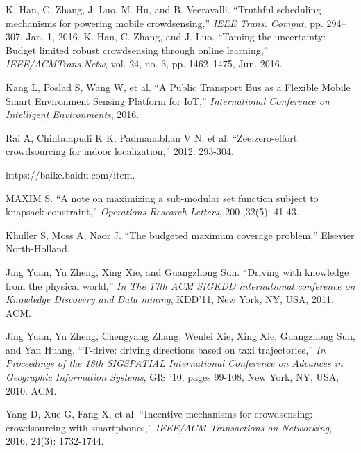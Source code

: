 \documentclass[journal]{IEEEtran}
\begin{document}
\begin{thebibliography}{1}
K. Han, C. Zhang, J. Luo, M. Hu, and B. Veeravalli. ``Truthful scheduling mechanisms for powering mobile crowdsensing,'' \textit{IEEE Trans. Comput}, pp. 294–307, Jan. 1, 2016.
K. Han, C. Zhang, and J. Luo. ``Taming the uncertainty: Budget limited robust crowdsensing through online learning,'' \textit{IEEE/ACMTrans.Netw}, vol. 24, no. 3, pp. 1462–1475, Jun. 2016. 




 Kang L, Poslad S, Wang W, et al. ``A Public Transport Bus as a Flexible Mobile Smart Environment Sensing Platform for IoT,'' \textit{International Conference on Intelligent Environments}, 2016.
 
 Rai A, Chintalapudi K K, Padmanabhan V N, et al. ``Zee:zero-effort crowdsourcing for indoor localization,'' 2012: 293-304.
 
https://baike.baidu.com/item.

 MAXIM S. ``A note on maximizing a sub-modular set function subject to knapsack constraint,'' \textit{Operations Research Letters}, 200 ,32(5): 41-43.
 
Khuller S, Moss A, Naor J. ``The budgeted maximum coverage problem,'' Elsevier North-Holland.

Jing Yuan, Yu Zheng, Xing Xie, and Guangzhong Sun. ``Driving with knowledge from the physical world,'' \textit{In The 17th ACM SIGKDD international conference on Knowledge Discovery and Data mining}, KDD’11, New York, NY, USA, 2011. ACM.

Jing Yuan, Yu Zheng, Chengyang Zhang, Wenlei Xie, Xing Xie, Guangzhong Sun, and Yan Huang. ``T-drive: driving directions based on taxi trajectories,'' \textit{In Proceedings of the 18th SIGSPATIAL International Conference on Advances in Geographic Information Systems}, GIS ’10, pages 99-108, New York, NY, USA, 2010. ACM.

Yang D, Xue G, Fang X, et al. ``Incentive mechanisms for crowdsensing: crowdsourcing with smartphones,'' \textit{IEEE/ACM Transactions on Networking}, 2016, 24(3): 1732-1744.





\end{thebibliography}
\end{document}
